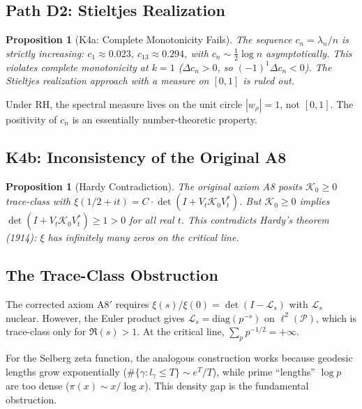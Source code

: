 \documentclass[12pt,a4paper]{article}
\newtheorem{proposition}[theorem]{Proposition}
\theoremstyle{definition}
\theoremstyle{remark}
\newcommand{\PP}{\mathcal{P}}
\begin{document}
\subsection{Path D2: Stieltjes Realization}

\begin{proposition}[K4a: Complete Monotonicity Fails]
The sequence $c_n = \lambda_n/n$ is \emph{strictly increasing}: $c_1 \approx 0.023$, $c_{13} \approx 0.294$, with $c_n \sim \frac{1}{2}\log n$ asymptotically. This violates complete monotonicity at $k = 1$ ($\Delta c_n > 0$, so $(-1)^1\Delta c_n < 0$). The Stieltjes realization approach with a measure on $[0,1]$ is ruled out.
\end{proposition}

Under RH, the spectral measure lives on the unit circle $|w_\rho| = 1$, not $[0,1]$. The positivity of $c_n$ is an essentially number-theoretic property.

\subsection{K4b: Inconsistency of the Original A8}

\begin{proposition}[Hardy Contradiction]
The original axiom A8 posits $\mathcal{K}_0 \geq 0$ trace-class with $\xi(1/2+it) = C\cdot\det(I + V_t\mathcal{K}_0V_t^*)$. But $\mathcal{K}_0 \geq 0$ implies $\det(I + V_t\mathcal{K}_0V_t^*) \geq 1 > 0$ for all real $t$. This contradicts Hardy's theorem (1914): $\xi$ has infinitely many zeros on the critical line.
\end{proposition}

\subsection{The Trace-Class Obstruction}

The corrected axiom A8$'$ requires $\xi(s)/\xi(0) = \det(I - \mathcal{L}_s)$ with $\mathcal{L}_s$ nuclear. However, the Euler product gives $\mathcal{L}_s = \mathrm{diag}(p^{-s})$ on $\ell^2(\PP)$, which is trace-class only for $\Re(s) > 1$. At the critical line, $\sum_p p^{-1/2} = +\infty$.

For the Selberg zeta function, the analogous construction works because geodesic lengths grow exponentially ($\#\{\gamma: l_\gamma \leq T\} \sim e^T/T$), while prime ``lengths'' $\log p$ are too dense ($\pi(x) \sim x/\log x$). This density gap is the fundamental obstruction.
\end{document}
